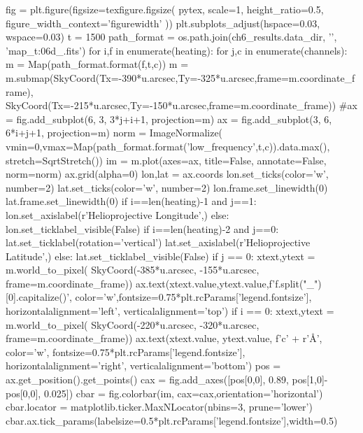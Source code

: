 \begin{pycode}
fig = plt.figure(figsize=texfigure.figsize(
    pytex,
    scale=1,
    height_ratio=0.5, 
    figure_width_context='figurewidth'
))
plt.subplots_adjust(hspace=0.03, wspace=0.03)
t = 1500
path_format = os.path.join(ch6_results.data_dir, '{}', 'map_t{:06d}_{}.fits')
for i,f in enumerate(heating):
    for j,c in enumerate(channels):
        m = Map(path_format.format(f,t,c))
        m = m.submap(SkyCoord(Tx=-390*u.arcsec,Ty=-325*u.arcsec,frame=m.coordinate_frame),
                     SkyCoord(Tx=-215*u.arcsec,Ty=-150*u.arcsec,frame=m.coordinate_frame))
        #ax = fig.add_subplot(6, 3, 3*j+i+1, projection=m)
        ax = fig.add_subplot(3, 6, 6*i+j+1, projection=m)
        norm = ImageNormalize(
            vmin=0,vmax=Map(path_format.format('low_frequency',t,c)).data.max(),
            stretch=SqrtStretch())
        im = m.plot(axes=ax, title=False, annotate=False, norm=norm)
        ax.grid(alpha=0)
        lon,lat = ax.coords
        lon.set_ticks(color='w', number=2)
        lat.set_ticks(color='w', number=2)
        lon.frame.set_linewidth(0)
        lat.frame.set_linewidth(0)
        if i==len(heating)-1 and j==1:
            lon.set_axislabel(r'Helioprojective Longitude',)
        else:
            lon.set_ticklabel_visible(False)
        if i==len(heating)-2 and j==0:
            lat.set_ticklabel(rotation='vertical')
            lat.set_axislabel(r'Helioprojective Latitude',)
        else:
            lat.set_ticklabel_visible(False)
        if j == 0:
            xtext,ytext = m.world_to_pixel(
                SkyCoord(-385*u.arcsec, -155*u.arcsec, frame=m.coordinate_frame))
            ax.text(xtext.value,ytext.value,f'{f.split("_")[0].capitalize()}',
                    color='w',fontsize=0.75*plt.rcParams['legend.fontsize'],
                    horizontalalignment='left', verticalalignment='top')
        if i == 0:
            xtext,ytext = m.world_to_pixel(
                SkyCoord(-220*u.arcsec, -320*u.arcsec, frame=m.coordinate_frame))
            ax.text(xtext.value, ytext.value, f'{c}' + r'\si{\angstrom}',
                    color='w', fontsize=0.75*plt.rcParams['legend.fontsize'],
                    horizontalalignment='right', verticalalignment='bottom')
            pos = ax.get_position().get_points()
            cax = fig.add_axes([pos[0,0], 0.89, pos[1,0]-pos[0,0], 0.025])
            cbar = fig.colorbar(im, cax=cax,orientation='horizontal')
            cbar.locator = matplotlib.ticker.MaxNLocator(nbins=3, prune='lower')
            cbar.ax.tick_params(labelsize=0.5*plt.rcParams['legend.fontsize'],width=0.5)

\end{pycode}
